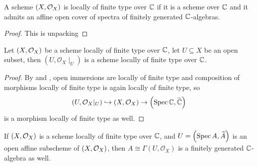 \begin{lemma}
    A scheme $\left(X, \mathcal{O}_{X}\right)$ is locally of finite type over $\mathbb{C}$ if it is a scheme over $\mathbb{C}$ and it admits an affine open cover of spectra of finitely generated $\mathbb{C}$-algebras.
\end{lemma}

\begin{proof}
    This is unpacking 
\end{proof}


\begin{proposition}
  \leanok{}
  Let $\left(X, \mathcal{O}_{X}\right)$ be a scheme locally of finite type over $\mathbb{C}$, let $U \subseteq X$ be an open subset, then $(U, \mathcal{O}_{X}\mid_{U})$ is a scheme locally of finite type over $\mathbb{C}$.
  \label{thm:restriction-of-scheme-of-finite-type-is-scheme-of-finite-type}
\end{proposition}
\begin{proof}
  By  and , open immersions are locally of finite type and composition of morphisms locally of finite type is again locally of finite type, so
  \[
    \left(U, \mathcal{O}_{X}|_{U}\right) \hookrightarrow \left(X, \mathcal{O}_{X}\right) \to \left(\operatorname*{Spec}{\mathbb{C}}, \widetilde{\mathbb{C}}\right)
  \]
  is a morphism locally of finite type as well.
\end{proof}

\begin{proposition}\label{thm:affine-open-is-finite-algebra}
  If $\left(X, \mathcal{O}_{X}\right)$ is a scheme locally of finite type over $\mathbb{C}$, and $U = \left(\operatorname*{Spec}{A}, \widetilde{A}\right)$ is an open affine subscheme of $\left(X, \mathcal{O}_{X}\right)$, then $A \cong \Gamma(U, \mathcal{O}_{X})$ is a finitely generated $\mathbb{C}$-algebra as well.
  \leanok
\end{proposition}

